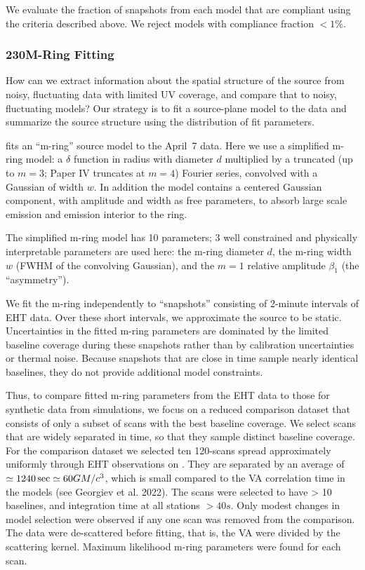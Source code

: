 We evaluate the fraction of snapshots from each model that are
compliant using the criteria described above.
We reject models with compliance fraction $< 1\%$.

\subsubsection{230\GHz M-Ring Fitting}

How can we extract information about the spatial structure of the source from noisy, fluctuating data with limited UV coverage, and compare that to noisy, fluctuating models?
Our strategy is to fit a source-plane model to the data and summarize the source structure using the distribution of fit parameters.

 fits an ``m-ring'' source model to the April~7 data.  Here we use a simplified m-ring model: a $\delta$ function in radius with diameter $d$ multiplied by a truncated (up to $m = 3$; Paper IV truncates at $m = 4$) Fourier series, convolved with a Gaussian of width $w$.  In addition the model contains a centered Gaussian component, with amplitude and width as free parameters, to absorb large scale emission and emission interior to the ring.

The simplified m-ring model has 10 parameters; 3 well constrained and physically interpretable parameters are used here: the m-ring diameter $d$, the m-ring width $w$ (FWHM of the convolving  Gaussian), and the $m=1$ relative amplitude $\beta_1$ (the ``asymmetry'').

We fit the m-ring independently to ``snapshots'' consisting of 2-minute intervals of EHT data. Over these short intervals, we approximate the source to be static.  Uncertainties in the fitted m-ring parameters are dominated by the limited baseline coverage during these snapshots rather than by calibration uncertainties or thermal noise. Because snapshots that are close in time sample nearly identical baselines, they do not provide additional model constraints.

Thus, to compare fitted m-ring parameters from the EHT data to those for synthetic data from simulations, we focus on a reduced comparison dataset that consists of only a subset of scans with the best baseline coverage. We select scans that are widely separated in time, so that they sample distinct baseline coverage. For the comparison dataset we selected ten 120-\sec scans spread approximately uniformly through EHT observations on \aprilvii.  They are separated by an average of $\simeq 1240\,\mathrm{sec} \simeq 60 GM/c^3$, which is small compared to the VA correlation time in the models (see Georgiev et al. 2022). The scans were selected to have > 10 baselines, and integration time at all stations $> 40s$.  Only modest changes in model selection were observed if any one scan was removed from the comparison.  The data were de-scattered before fitting, that is, the VA were divided by the scattering kernel.  Maximum likelihood m-ring parameters were found for each scan.


